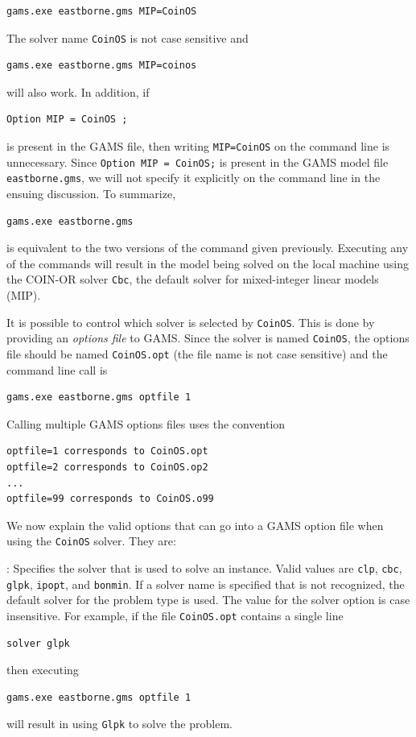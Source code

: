 \documentclass[11pt]{article}
\renewcommand{\_}{{\char"5F}}
\renewcommand{\{}{{\char"7B}}
\renewcommand{\}}{{\char"7D}}
\renewcommand{\^}{{\char"0D}}
\renewcommand{\'}{{\char"0D}}
\begin{document}
\begin{enumerate}[Step 1:]
\begin{verbatim}
gams.exe eastborne.gms MIP=CoinOS
\end{verbatim}
The solver name {\tt CoinOS} is not case sensitive and 
\begin{verbatim}
gams.exe eastborne.gms MIP=coinos
\end{verbatim}
will also work.  In addition, if
\begin{verbatim}
Option MIP = CoinOS ;
\end{verbatim}
is present in the GAMS file, then writing {\tt MIP=CoinOS} on the command line is unnecessary.
Since {\tt Option MIP = CoinOS;} is present in the GAMS model file {\tt eastborne.gms}, 
we will not specify it explicitly on the command line in the ensuing discussion. To summarize,
\begin{verbatim}
gams.exe eastborne.gms 
\end{verbatim}
is equivalent to the two versions of the command given previously.  Executing any of the commands will 
result in the model being solved on the local machine using the COIN-OR solver {\tt Cbc}, the default solver 
for 
mixed-integer linear models (MIP).

It is possible to control which solver is selected by {\tt CoinOS}.    This is done by providing an {\it options file}  to  GAMS.   
Since the solver is named {\tt  CoinOS}, the options file should  be named {\tt CoinOS.opt}  (the file name is not case sensitive)
and the command line call is 
\begin{verbatim}
gams.exe eastborne.gms optfile 1
\end{verbatim}
Calling multiple GAMS options files uses the convention
\begin{verbatim}
optfile=1 corresponds to CoinOS.opt
optfile=2 corresponds to CoinOS.op2
...
optfile=99 corresponds to CoinOS.o99
\end{verbatim}

We now explain the valid options that can go into a GAMS option file when using the {\tt CoinOS} solver.  They are:

\vskip 8pt
:   Specifies the solver that is used to solve an instance. 
Valid values are {\tt clp},  {\tt cbc}, {\tt glpk}, {\tt ipopt},  and {\tt bonmin}.  
If a solver name is specified that is not recognized, the default solver for the problem type is used.  
The value for the solver option is case insensitive. 
For example, if the file {\tt CoinOS.opt} contains a single line
\begin{verbatim}
solver glpk
\end{verbatim}
then executing
\begin{verbatim}
gams.exe eastborne.gms optfile 1
\end{verbatim}
will result in  using {\tt Glpk}  to solve the problem.   



\end{enumerate}
\end{document}
